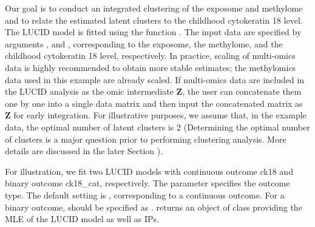 Our goal is to conduct an integrated clustering of the exposome and methylome and to relate the estimated latent clusters to the childhood cytokeratin 18 level. The LUCID model is fitted using the function . The input data are specified by arguments ,  and , corresponding to the exposome, the methylome, and the childhood cytokeratin 18 level, respectively. In practice, scaling of multi-omics data is highly recommended to obtain more stable estimates; the methylomics data used in this example are already scaled. If multi-omics data are included in the LUCID analysis as the omic intermediate $\bm Z$, the user can concatenate them one by one into a single data matrix and then input the concatenated matrix as $\bm Z$ for early integration. For illustrative purposes, we assume that, in the example data, the optimal number of latent clusters is 2 (Determining the optimal number of clusters is a major question prior to performing clustering analysis. More details are discussed in the later Section ). 

For illustration, we fit two LUCID models with continuous outcome ck18 and binary outcome ck18{\_}cat, respectively. The parameter  specifies the outcome type. The default setting is , corresponding to a continuous outcome. For a binary outcome,  should be specified as .  returns an object of class  providing the MLE of the LUCID model as well as IPs.

